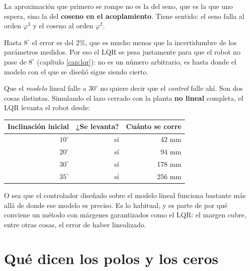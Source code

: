 \documentclass[11pt,a4paper]{report}
\begin{document}
\begin{idea}
La aproximación que primero se rompe no es la del seno, que es la que uno espera, sino la del
\textbf{coseno en el acoplamiento}. Tiene sentido: el seno falla al orden $\varphi^3$ y el
coseno al orden $\varphi^2$.

Hasta $8^\circ$ el error es del 2\%, que es mucho menos que la incertidumbre de los parámetros
medidos. Por eso el LQR se pesa justamente para que el robot no pase de $8^\circ$ (capítulo
\ref{cap:lqr}): no es un número arbitrario, es hasta donde el modelo con el que se diseñó
sigue siendo cierto.
\end{idea}

\begin{ojo}
Que el \emph{modelo} lineal falle a $30^\circ$ no quiere decir que el \emph{control} falle ahí.
Son dos cosas distintas. Simulando el lazo cerrado con la planta \textbf{no lineal} completa,
el LQR levanta el robot desde:

\begin{center}
\small
\begin{tabular}{@{}rrr@{}}
\toprule
Inclinación inicial & ¿Se levanta? & Cuánto se corre \\
\midrule
$10^\circ$ & sí & 42 mm \\
$20^\circ$ & sí & 94 mm \\
$30^\circ$ & sí & 178 mm \\
$35^\circ$ & sí & 256 mm \\
\bottomrule
\end{tabular}
\end{center}

O sea que el controlador diseñado sobre el modelo lineal funciona bastante más allá de donde
ese modelo es preciso. Es lo habitual, y es parte de por qué conviene un método con márgenes
garantizados como el LQR: el margen cubre, entre otras cosas, el error de haber linealizado.
\end{ojo}

\section{Qué dicen los polos y los ceros}\label{sec:polos}
\end{document}
